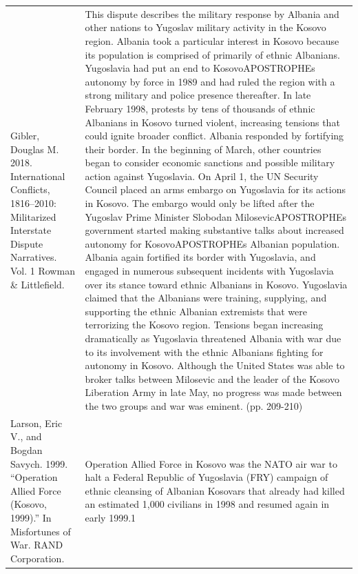 {\begin{longtable}{p{}p{}}
Gibler, Douglas M. 2018. International Conflicts, 1816–2010: Militarized Interstate Dispute Narratives. Vol. 1 Rowman \& Littlefield. & This dispute describes the military response by Albania and other nations to Yugoslav military activity in the Kosovo region. Albania took a particular interest in Kosovo because its population is comprised of primarily of ethnic Albanians. Yugoslavia had put an end to KosovoAPOSTROPHEs autonomy by force in 1989 and had ruled the region with a strong military and police presence thereafter. In late February 1998, protests by tens of thousands of ethnic Albanians in Kosovo turned violent, increasing tensions that could ignite broader conflict. Albania responded by fortifying their border. In the beginning of March, other countries began to consider economic sanctions and possible military action against Yugoslavia. On April 1, the UN Security Council placed an arms embargo on Yugoslavia for its actions in Kosovo. The embargo would only be lifted after the Yugoslav Prime Minister Slobodan MilosevicAPOSTROPHEs government started making substantive talks about increased autonomy for KosovoAPOSTROPHEs Albanian population. Albania again fortified its border with Yugoslavia, and engaged in numerous subsequent incidents with Yugoslavia over its stance toward ethnic Albanians in Kosovo. Yugoslavia claimed that the Albanians were training, supplying, and supporting the ethnic Albanian extremists that were terrorizing the Kosovo region. Tensions began increasing dramatically as Yugoslavia threatened Albania with war due to its involvement with the ethnic Albanians fighting for autonomy in Kosovo. Although the United States was able to broker talks between Milosevic and the leader of the Kosovo Liberation Army in late May, no progress was made between the two groups and war was eminent. (pp. 209-210)
\\
Larson, Eric V., and Bogdan Savych. 1999. “Operation Allied Force (Kosovo, 1999).” In Misfortunes of War. RAND Corporation. & Operation Allied Force in Kosovo was the NATO air war to halt a Federal Republic of Yugoslavia (FRY) campaign of ethnic cleansing of Albanian Kosovars that already had killed an estimated 1,000 civilians in 1998 and resumed again in early 1999.1
\\

\end{longtable}}
